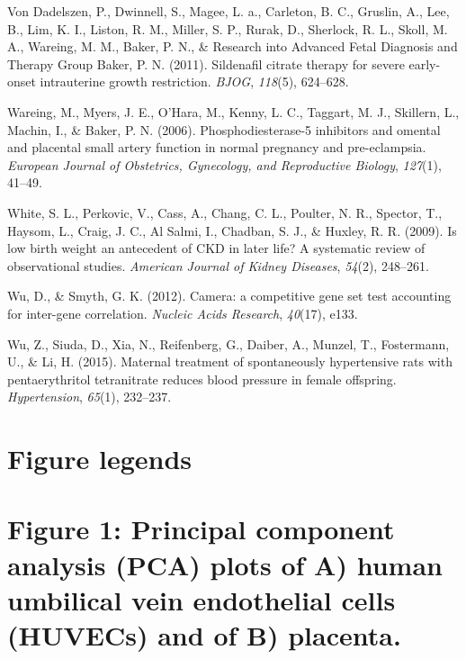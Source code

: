 \documentclass[authordate, empirical]{jote-new-article}
\begin{document}
	Von Dadelszen, P., Dwinnell, S., Magee, L. a., Carleton, B. C., Gruslin, A., Lee, B., Lim, K. I., Liston, R. M., Miller, S. P., Rurak, D., Sherlock, R. L., Skoll, M. A., Wareing, M. M., Baker, P. N., \& Research into Advanced Fetal Diagnosis and Therapy Group Baker, P. N. (2011). Sildenafil citrate therapy for severe early-onset intrauterine growth restriction. \emph{BJOG}, \emph{118}(5), 624--628.



	Wareing, M., Myers, J. E., O'Hara, M., Kenny, L. C., Taggart, M. J., Skillern, L., Machin, I., \& Baker, P. N. (2006). Phosphodiesterase-5 inhibitors and omental and placental small artery function in normal pregnancy and pre-eclampsia. \emph{European Journal of Obstetrics, Gynecology, and Reproductive Biology}, \emph{127}(1), 41--49.



	White, S. L., Perkovic, V., Cass, A., Chang, C. L., Poulter, N. R., Spector, T., Haysom, L., Craig, J. C., Al Salmi, I., Chadban, S. J., \& Huxley, R. R. (2009). Is low birth weight an antecedent of CKD in later life? A systematic review of observational studies. \emph{American Journal of Kidney Diseases}, \emph{54}(2), 248--261.



	Wu, D., \& Smyth, G. K. (2012). Camera: a competitive gene set test accounting for inter-gene correlation. \emph{Nucleic Acids Research}, \emph{40}(17), e133.



	Wu, Z., Siuda, D., Xia, N., Reifenberg, G., Daiber, A., Munzel, T., Fostermann, U., \& Li, H. (2015). Maternal treatment of spontaneously hypertensive rats with pentaerythritol tetranitrate reduces blood pressure in female offspring. \emph{Hypertension}, \emph{65}(1), 232--237.











	\section{Figure legends}







	\section{\textbf{Figure 1: Principal component analysis (PCA) plots of A) human umbilical vein endothelial cells (HUVECs) and of B) placenta.}}
\end{document}
